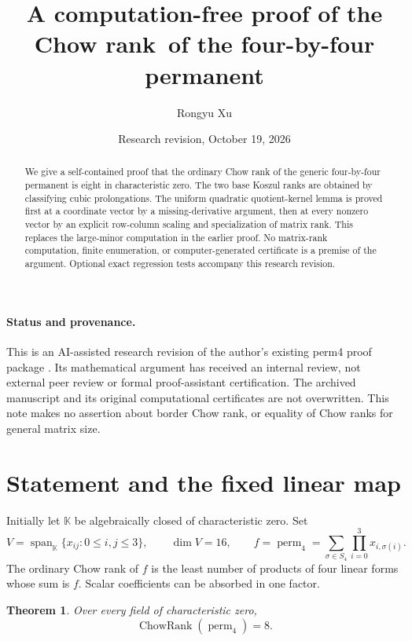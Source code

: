 \documentclass[11pt]{article}
\title{A computation-free proof of the Chow rank\ of the four-by-four permanent}
\author{Rongyu Xu}
\date{Research revision, October 19, 2026}
\newtheorem{theorem}{Theorem}[section]
\theoremstyle{remark}
\newcommand{\kk}{\mathbb K}
\newcommand{\Span}{\operatorname{span}}
\newcommand{\perm}{\operatorname{perm}}
\newcommand{\ChowRank}{\operatorname{ChowRank}}
\begin{document}
\maketitle
\begin{abstract}
We give a self-contained proof that the ordinary Chow rank of the generic
four-by-four permanent is eight in characteristic zero. The two base Koszul
ranks are obtained by classifying cubic prolongations. The uniform quadratic
quotient-kernel lemma is proved first at a coordinate vector by a
missing-derivative argument, then at every nonzero vector by an explicit
row-column scaling and specialization of matrix rank. This replaces the
large-minor computation in the earlier proof. No matrix-rank computation,
finite enumeration, or computer-generated certificate is a premise of the
argument. Optional exact regression tests accompany this research revision.
\end{abstract}

\paragraph{Status and provenance.}
This is an AI-assisted research revision of the author's existing perm4
proof package \cite{original}. Its mathematical argument has received an
internal review, not external peer review or formal proof-assistant
certification. The archived manuscript and its original computational
certificates are not overwritten. This note makes no assertion about border
Chow rank, or equality of Chow ranks for general matrix size.

\section{Statement and the fixed linear map}
Initially let $\kk$ be algebraically closed of characteristic zero. Set
\[
 V=\Span_{\kk}\{x_{ij}:0\leq i,j\leq3\},\qquad \dim V=16,
 \qquad f=\perm_4=\sum_{\sigma\in S_4}\prod_{i=0}^3x_{i,\sigma(i)}.
\]
The ordinary Chow rank of $f$ is the least number of products of four linear
forms whose sum is $f$. Scalar coefficients can be absorbed in one factor.
\begin{theorem}\label{thm:main}
Over every field of characteristic zero,
\[
 \ChowRank(\perm_4)=8.
\]
\end{theorem}
\end{document}
